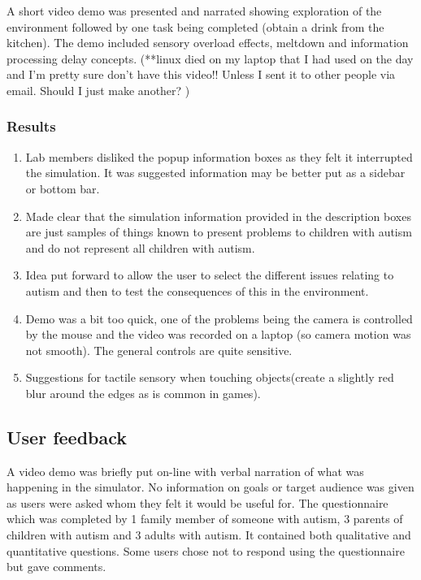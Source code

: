 \documentclass[11pt]{report}
\begin{document}
A short video demo was presented and narrated showing exploration of the environment followed by one task being completed (obtain a drink from the kitchen). The demo included sensory overload effects, meltdown and information processing delay concepts. (**linux died on my laptop that I had used on the day and I'm pretty sure don't have this video!! Unless I sent it to other people via email. Should I just make another? )

\subsubsection{Results}

\begin{enumerate}
\item Lab members disliked the popup information boxes as they felt it interrupted the simulation. It was suggested information may be better put as a sidebar or bottom bar.
\item Made clear that the simulation information provided in the description boxes are just samples of things known to present problems to children with autism and do not represent all children with autism.
\item Idea put forward to allow the user to select the different issues relating to autism and then to test the consequences of this in the environment. 
\item Demo was a bit too quick, one of the problems being the camera is controlled by the mouse and the video was recorded on a laptop (so camera motion was not smooth). The general controls are quite sensitive.
\item Suggestions for tactile sensory when touching objects(create a slightly red blur around the edges as is common in games).
\end{enumerate}


\subsection{User feedback}
A video demo was briefly put on-line with verbal narration of what was happening in the simulator. No information on goals or target audience was given as users were asked whom they felt it would be useful for. The questionnaire which was completed by 1 family member of someone with autism, 3 parents of children with autism and 3 adults with autism. It contained both qualitative and quantitative questions. Some users chose not to respond using the questionnaire but gave comments. 
\end{document}
